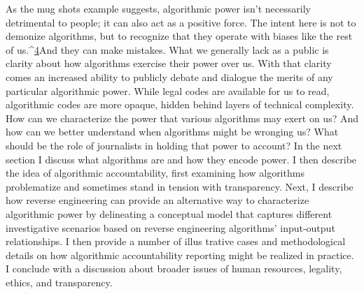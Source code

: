 As the mug shots example suggests, algorithmic power isn't necessarily detrimental to people; it can also act as a positive force. The intent here is not to demonize algorithms, but to recognize that they operate with biases like the rest of us.^{\href{#endnotes}{4}}And they can make mistakes. What we generally lack as a public is clarity about how algorithms exercise their power over us. With that clarity comes an increased ability to publicly debate and dialogue the merits of any particular algorithmic power. While legal codes are available for us to read, algorithmic codes are more opaque, hidden behind layers of technical complexity. How can we characterize the power that various algorithms may exert on us? And how can we better understand when algorithms might be wronging us? What should be the role of journalists in holding that power to account? 
In the next section I discuss what algorithms are and how they encode power. I then describe the idea of algorithmic accountability, first examining how algorithms problematize and sometimes stand in tension with transparency. Next, I describe how reverse engineering can provide an alternative way to characterize algorithmic power by delineating a conceptual model that captures different investigative scenarios based on reverse engineering algorithms' input-output relationships. I then provide a number of illus
trative cases and methodological details on how algorithmic accountability reporting might be realized in practice. I conclude with a discussion about broader issues of human resources, legality, ethics, and transparency. 

